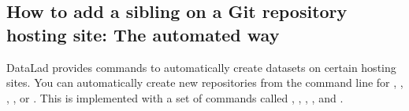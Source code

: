 \subsection{How to add a sibling on a Git repository hosting site: The automated way}
\label{\detokenize{basics/101-139-hostingservices:how-to-add-a-sibling-on-a-git-repository-hosting-site-the-automated-way}}
\sphinxAtStartPar
DataLad provides  commands to automatically create datasets on certain hosting sites.
You can automatically create new repositories from the command line for {\hyperref[\detokenize{glossary:term-GitHub}]{}}, {\hyperref[\detokenize{glossary:term-GitLab}]{}}, {\hyperref[\detokenize{glossary:term-GIN}]{}}, , or .
This is implemented with a set of commands called , , , , and .

